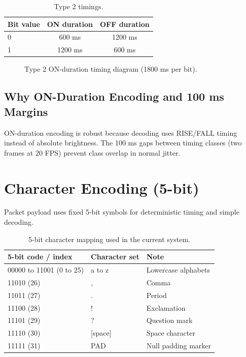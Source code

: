 \documentclass[10pt,a4paper]{article}
\begin{document}
\begin{table}[H]
\centering
\caption{Type 2 timings.}
\begin{tabular}{lcc}
\toprule
Bit value & ON duration & OFF duration \\
\midrule
0 & 600 ms & 1200 ms \\
1 & 1200 ms & 600 ms \\
\bottomrule
\end{tabular}
\end{table}

\begin{figure}[H]
\centering
{}
\caption{Type 2 ON-duration timing diagram (1800 ms per bit).}
\end{figure}

\subsection{Why ON-Duration Encoding and 100 ms Margins}
ON-duration encoding is robust because decoding uses RISE/FALL timing instead of absolute brightness. The 100 ms gaps between timing classes (two frames at 20 FPS) prevent class overlap in normal jitter.

\section{Character Encoding (5-bit)}
Packet payload uses fixed 5-bit symbols for deterministic timing and simple decoding.

\begin{table}[H]
\centering
\caption{5-bit character mapping used in the current system.}
\begin{tabular}{lll}
\toprule
5-bit code / index & Character set & Note \\
\midrule
00000 to 11001 (0 to 25) & a to z & Lowercase alphabets \\
11010 (26) & , & Comma \\
11011 (27) & . & Period \\
11100 (28) & ! & Exclamation \\
11101 (29) & ? & Question mark \\
11110 (30) & [space] & Space character \\
11111 (31) & PAD & Null padding marker \\
\bottomrule
\end{tabular}
\end{table}
\end{document}
